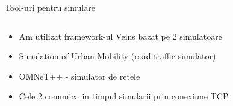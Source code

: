 \documentclass{beamer}
\begin{document}
\begin{frame}{Tool-uri pentru simulare}
	\begin{columns}[t]
		\begin{column}{0.5\textwidth}
			\begin{itemize}
			  \item Am utilizat framework-ul Veins bazat pe 2 simulatoare
			  \item Simulation of Urban Mobility (road traffic simulator)
			  \item OMNeT++ - simulator de retele
			  \item Cele 2 comunica in timpul simularii prin conexiune TCP
			\end{itemize}
		\end{column}
		\begin{column}{0.5\textwidth}
			\begin{figure}
				\centering
			\end{figure}
		\end{column}
	\end{columns}
\end{frame}
\end{document}
